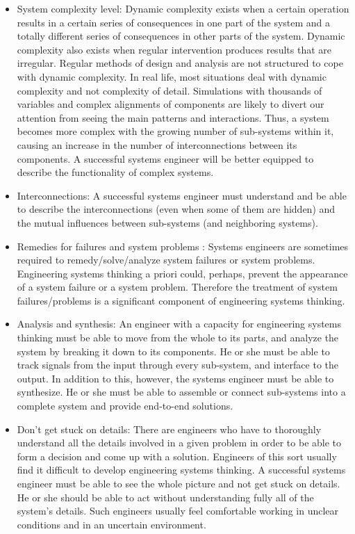\documentclass[11pt]{article}
\begin{document}
\begin{itemize}
\item System complexity level:  Dynamic complexity exists when a certain operation results in a certain series of consequences in one part of the system and a totally different series of consequences in other parts of the system. Dynamic complexity also exists when regular intervention produces results that are irregular. Regular methods of design and analysis are not structured to cope with dynamic complexity. In real life, most situations deal with dynamic complexity and not complexity of detail. Simulations with thousands of variables and complex alignments of components are likely to divert our attention from seeing the main patterns and interactions.  Thus, a system becomes more complex with the growing number of sub-systems within it, causing an increase in the number of interconnections between its components. A successful systems engineer will be better equipped to describe the functionality of complex systems.

\item Interconnections: A successful systems engineer must understand and be able to describe the interconnections (even when some of them are hidden) and the mutual influences between sub-systems (and neighboring systems).

\item Remedies for failures and system problems : Systems engineers are sometimes required to remedy/solve/analyze system failures or system problems. Engineering systems thinking a priori could, perhaps, prevent the appearance of a system failure or a system problem. Therefore the treatment of system failures/problems is a significant component of engineering systems thinking.

\item Analysis and synthesis: An engineer with a capacity for engineering systems thinking must be able to move from the whole to its parts, and analyze the system by breaking it down to its components. He or she must be able to track signals from the input through every sub-system, and interface to the output. In addition to this, however, the systems engineer must be able to synthesize. He or she must be able to assemble or connect sub-systems into a complete system and provide end-to-end solutions.

\item Don't get stuck on details: There are engineers who have to thoroughly understand all the details involved in a given problem in order to be able to form a decision and come up with a solution. Engineers of this sort usually find it difficult to develop engineering systems thinking. A successful systems engineer must be able to see the whole picture and not get stuck on details. He or she should be able to act without understanding fully all of the system's details. Such engineers usually feel comfortable working in unclear conditions and in an uncertain environment.


\end{itemize}
\end{document}
